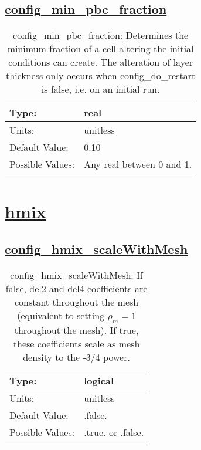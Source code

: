 \subsection[config\_min\_pbc\_fraction]{\hyperref[sec:nm_tab_partial_bottom_cells]{config\_min\_pbc\_fraction}}
\label{subsec:nm_sec_config_min_pbc_fraction}
\begin{center}
\begin{longtable}{| p{2.0in} || p{4.0in} |}
    \hline
    Type: & real \\
    \hline
    Units: & \si{unitless} \\
    \hline
    Default Value: & 0.10 \\
    \hline
    Possible Values: & Any real between 0 and 1. \\
    \hline
    \caption{config\_min\_pbc\_fraction: Determines the minimum fraction of a cell altering the initial conditions can create. The alteration of layer thickness only occurs when config\_do\_restart is false, i.e. on an initial run.}
\end{longtable}
\end{center}
\section[hmix]{\hyperref[sec:nm_tab_hmix]{hmix}}
\label{sec:nm_sec_hmix}
\subsection[config\_hmix\_scaleWithMesh]{\hyperref[sec:nm_tab_hmix]{config\_hmix\_scaleWithMesh}}
\label{subsec:nm_sec_config_hmix_scaleWithMesh}
\begin{center}
\begin{longtable}{| p{2.0in} || p{4.0in} |}
    \hline
    Type: & logical \\
    \hline
    Units: & \si{unitless} \\
    \hline
    Default Value: & .false. \\
    \hline
    Possible Values: & .true. or .false. \\
    \hline
    \caption{config\_hmix\_scaleWithMesh: If false, del2 and del4 coefficients are constant throughout the mesh (equivalent to setting $\rho_m=1$ throughout the mesh).  If true, these coefficients scale as mesh density to the -3/4 power.}
\end{longtable}
\end{center}
